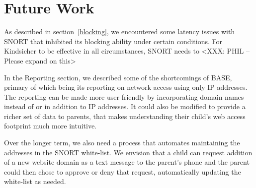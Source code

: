 
\section{Future Work}

As described in section~\ref{blocking}, we encountered some latency issues with
SNORT that inhibited its blocking ability under certain conditions. For
Kindsicher to be effective in all circumstances, SNORT needs to <XXX: PHIL –
Please expand on this>

In the Reporting section, we described some of the shortcomings of BASE,
primary of which being its reporting on network access using only IP addresses.
The reporting can be made more user friendly by incorporating domain names
instead of or in addition to IP addresses. It could also be modified to provide
a richer set of data to parents, that makes understanding their child's web
access footprint much more intuitive.

Over the longer term, we also need a process that automates maintaining the
addresses in the SNORT white-list. We envision that a child can request
addition of a new website domain as a text message to the parent's phone and
the parent could then chose to approve or deny that request, automatically
updating the white-list as needed.
